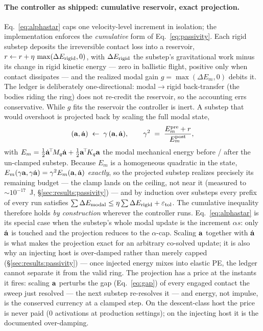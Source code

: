 \paragraph*{The controller as shipped: cumulative reservoir, exact projection.}
Eq.~\ref{eq:alphastar} caps one velocity-level increment in isolation; the
implementation enforces the \emph{cumulative} form of Eq.~\ref{eq:passivity}.
Each rigid substep deposits the irreversible contact loss into a reservoir,
$r \leftarrow r + \eta\,\max(\Delta E_{\mathrm{rigid}},0)$, with $\Delta E_{\mathrm{rigid}}$ the substep's
gravitational work minus its change in rigid kinetic energy --- zero in
ballistic flight, positive only when contact dissipates --- and the realized
modal gain $g=\max(\Delta E_m,0)$ debits it. The ledger is deliberately
one-directional: modal$\to$rigid back-transfer (the bodies riding the ring)
does not re-credit the reservoir, so the accounting errs conservative. While $g$ fits the reservoir the
controller is inert. A substep that would overshoot is projected back by
scaling the full modal state,
\begin{equation}
  (\mathbf{a},\dot{\mathbf{a}}) \;\leftarrow\; \gamma\,(\mathbf{a},\dot{\mathbf{a}}), \qquad
  \gamma^2 \;=\; \frac{E_m^{\mathrm{pre}} + r}{E_m^{\mathrm{post}}},
  \label{eq:gammaproj}
\end{equation}
with $E_m=\tfrac12\dot{\mathbf{a}}^{\!\top}\!M_q\dot{\mathbf{a}}+\tfrac12\mathbf{a}^{\!\top}\!K_q\mathbf{a}$
the modal mechanical energy before / after the un-clamped substep. Because
$E_m$ is a homogeneous quadratic in the state,
$E_m(\gamma\mathbf{a},\gamma\dot{\mathbf{a}})=\gamma^2E_m(\mathbf{a},\dot{\mathbf{a}})$ \emph{exactly}, so
the projected substep realizes precisely its remaining budget --- the clamp
lands on the ceiling, not near it (measured to $\sim\!10^{-17}$~J,
\S\ref{sec:results:passivity}) --- and by induction over substeps every prefix
of every run satisfies
$\sum\Delta E_{\mathrm{modal}} \le \eta\sum\Delta E_{\mathrm{rigid}} + \varepsilon_{\mathrm{tol}}$. The cumulative
inequality therefore holds \emph{by construction} wherever the controller
runs. Eq.~\ref{eq:alphastar} is its special case when the substep's whole
modal update is the increment $\alpha s$: only $\dot{\mathbf{a}}$ is touched and the
projection reduces to the $\alpha$-cap. Scaling $\mathbf{a}$ together with
$\dot{\mathbf{a}}$ is what makes the projection exact for an arbitrary co-solved
update; it is also why an injecting host is over-damped rather than merely
capped (\S\ref{sec:results:passivity}) --- once injected energy mixes into
elastic PE, the ledger cannot separate it from the valid ring. The projection
has a price at the instants it fires: scaling $\mathbf{a}$ perturbs the gap
(Eq.~\ref{eq:gap}) of every engaged contact the sweep just resolved --- the
next substep re-resolves it --- and energy, not impulse, is the conserved
currency at a clamped step. On the descent-class host the price is never paid
($0$ activations at production settings); on the injecting host it is the
documented over-damping.

